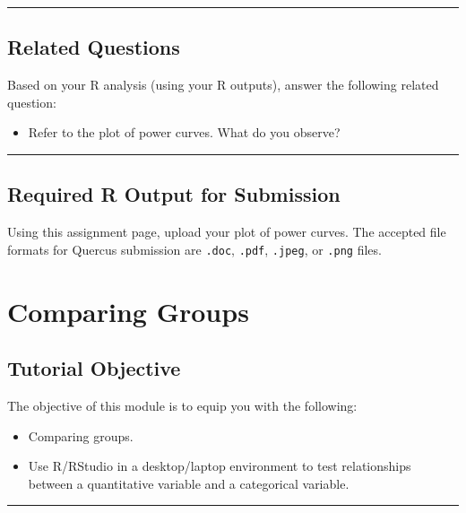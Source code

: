 \documentclass[oneside,openany]{book}
\providecommand{\tightlist}{%
  \setlength{\itemsep}{0pt}\setlength{\parskip}{0pt}}
\begin{document}
\begin{center}\rule{0.5\linewidth}{0.5pt}\end{center}

\section{Related Questions}\label{related-questions-6}

Based on your R analysis (using your R outputs), answer the following related question:

\begin{itemize}
\tightlist
\item
  Refer to the plot of power curves. What do you observe?
\end{itemize}

\begin{center}\rule{0.5\linewidth}{0.5pt}\end{center}

\section{Required R Output for Submission}\label{required-r-output-for-submission-3}

Using this assignment page, upload your plot of power curves. The accepted file formats for Quercus submission are \texttt{.doc}, \texttt{.pdf}, \texttt{.jpeg}, or \texttt{.png} files.

\chapter{Comparing Groups}\label{activity-8---comparing-groups}

\section{Tutorial Objective}\label{tutorial-objective-5}

The objective of this module is to equip you with the following:
\begin{itemize}
    \item Comparing groups.
    \item Use R/RStudio in a desktop/laptop environment to test relationships between a quantitative variable and a categorical variable.
\end{itemize}


\begin{center}\rule{0.5\linewidth}{0.5pt}\end{center}
\end{document}

